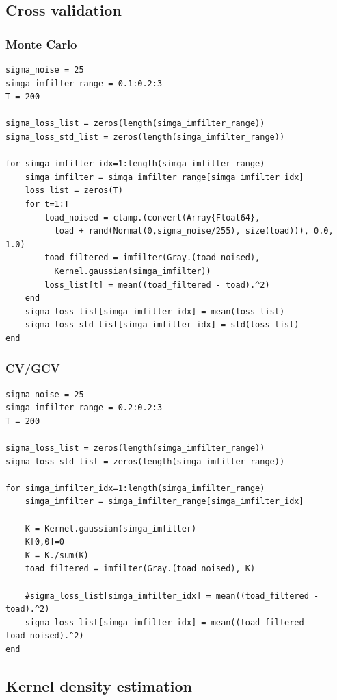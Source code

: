 \documentclass{article}
\begin{document}
\subsection{Cross validation}

\subsubsection{Monte Carlo}

\begin{lstlisting}
sigma_noise = 25
simga_imfilter_range = 0.1:0.2:3
T = 200

sigma_loss_list = zeros(length(simga_imfilter_range))
sigma_loss_std_list = zeros(length(simga_imfilter_range))

for simga_imfilter_idx=1:length(simga_imfilter_range)
    simga_imfilter = simga_imfilter_range[simga_imfilter_idx]
    loss_list = zeros(T)
    for t=1:T
        toad_noised = clamp.(convert(Array{Float64}, 
          toad + rand(Normal(0,sigma_noise/255), size(toad))), 0.0, 1.0)
        toad_filtered = imfilter(Gray.(toad_noised), 
          Kernel.gaussian(simga_imfilter))
        loss_list[t] = mean((toad_filtered - toad).^2)
    end
    sigma_loss_list[simga_imfilter_idx] = mean(loss_list)
    sigma_loss_std_list[simga_imfilter_idx] = std(loss_list)
end
\end{lstlisting}

\subsubsection{CV/GCV}

\begin{lstlisting}
sigma_noise = 25
simga_imfilter_range = 0.2:0.2:3
T = 200

sigma_loss_list = zeros(length(simga_imfilter_range))
sigma_loss_std_list = zeros(length(simga_imfilter_range))

for simga_imfilter_idx=1:length(simga_imfilter_range)
    simga_imfilter = simga_imfilter_range[simga_imfilter_idx]
    
    K = Kernel.gaussian(simga_imfilter)
    K[0,0]=0
    K = K./sum(K)
    toad_filtered = imfilter(Gray.(toad_noised), K)
    
    #sigma_loss_list[simga_imfilter_idx] = mean((toad_filtered - toad).^2)
    sigma_loss_list[simga_imfilter_idx] = mean((toad_filtered - toad_noised).^2)
end

\end{lstlisting}

\subsection{Kernel density estimation}
\end{document}
